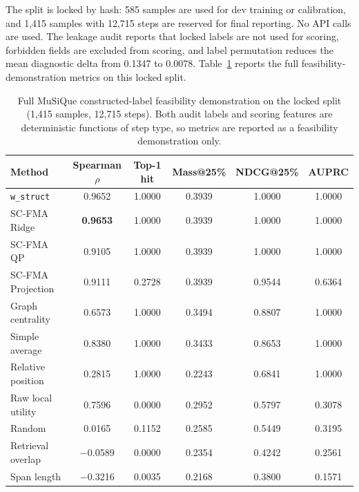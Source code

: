 \documentclass[a4paper,fleqn]{cas-sc}
\begin{document}
The split is locked by hash: 585 samples are used for dev training or calibration, and 1,415 samples with 12,715 steps are reserved for final reporting. No API calls are used. The leakage audit reports that locked labels are not used for scoring, forbidden fields are excluded from scoring, and label permutation reduces the mean diagnostic delta from 0.1347 to 0.0078. Table~\ref{tab:supp-musique-kbs-audit} reports the full feasibility-demonstration metrics on this locked split.

\begin{table}[ht]
\caption{Full MuSiQue constructed-label feasibility demonstration on the locked split (1,415 samples, 12,715 steps). Both audit labels and scoring features are deterministic functions of step type, so metrics are reported as a feasibility demonstration only.}
\label{tab:supp-musique-kbs-audit}
\centering
\small
\begin{tabular}{lccccc}
\toprule
\textbf{Method} & \textbf{Spearman $\rho$} & \textbf{Top-1 hit} & \textbf{Mass@25\%} & \textbf{NDCG@25\%} & \textbf{AUPRC} \\
\midrule
\texttt{w\_struct} & 0.9652 & 1.0000 & 0.3939 & 1.0000 & 1.0000 \\
SC-FMA Ridge & \textbf{0.9653} & 1.0000 & 0.3939 & 1.0000 & 1.0000 \\
SC-FMA QP & 0.9105 & 1.0000 & 0.3939 & 1.0000 & 1.0000 \\
SC-FMA Projection & 0.9111 & 0.2728 & 0.3939 & 0.9544 & 0.6364 \\
Graph centrality & 0.6573 & 1.0000 & 0.3494 & 0.8807 & 1.0000 \\
Simple average & 0.8380 & 1.0000 & 0.3433 & 0.8653 & 1.0000 \\
Relative position & 0.2815 & 1.0000 & 0.2243 & 0.6841 & 1.0000 \\
Raw local utility & 0.7596 & 0.0000 & 0.2952 & 0.5797 & 0.3078 \\
Random & 0.0165 & 0.1152 & 0.2585 & 0.5449 & 0.3195 \\
Retrieval overlap & $-$0.0589 & 0.0000 & 0.2354 & 0.4242 & 0.2561 \\
Span length & $-$0.3216 & 0.0035 & 0.2168 & 0.3800 & 0.1571 \\
\bottomrule
\end{tabular}
\end{table}
\end{document}
